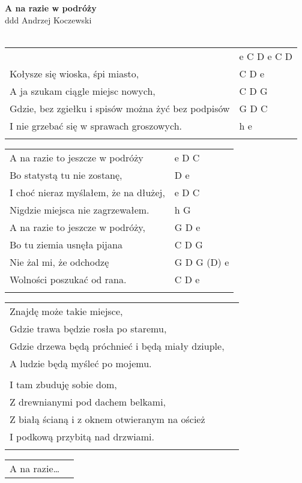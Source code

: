 \documentclass[a5paper]{article}
\begin{document}


\noindent
\fontsize{12pt}{15pt}\selectfont
\textbf{A na razie w podróży} \\ddd
\fontsize{8pt}{10pt}\selectfont
Andrzej Koczewski \\ \\
\fontsize{10pt}{12pt}\selectfont
{}
\begin{tabular}{@{}p{8.5cm}p{3cm}@{}}
\noindent
	& e C D e C D \\ 
Kołysze się wioska, śpi miasto, & C D e \\
A ja szukam ciągle miejsc nowych, & C D G \\
Gdzie, bez zgiełku i spisów można żyć bez podpisów & G D C \\
I nie grzebać się w sprawach groszowych. & h e \\ \\
\end{tabular}

\noindent
\begin{tabular}{@{}p{7.5cm}p{3cm}@{}}
A na razie to jeszcze w podróży & e D C \\
Bo statystą tu nie zostanę, & D e \\
I choć nieraz myślałem, że na dłużej, & e D C \\
Nigdzie miejsca nie zagrzewałem. & h G \\
A na razie to jeszcze w podróży, & G D e \\
Bo tu ziemia usnęła pijana & C D G \\
Nie żal mi, że odchodzę & G D G (D) e \\
Wolności poszukać od rana. & C D e \\ \\
\end{tabular}

\noindent
\begin{tabular}{@{}p{8.5cm}p{3cm}@{}}
Znajdę może takie miejsce, \\
Gdzie trawa będzie rosła po staremu, \\
Gdzie drzewa będą próchnieć i będą miały dziuple, \\
A ludzie będą myśleć po mojemu. \\ \\
I tam zbuduję sobie dom, \\
Z drewnianymi pod dachem belkami, \\
Z białą ścianą i z oknem otwieranym na oścież \\
I podkową przybitą nad drzwiami. \\ \\
\end{tabular}

\noindent
\begin{tabular}{@{}p{8.5cm}p{3cm}@{}}
A na razie…
\end{tabular}
\end{document}
